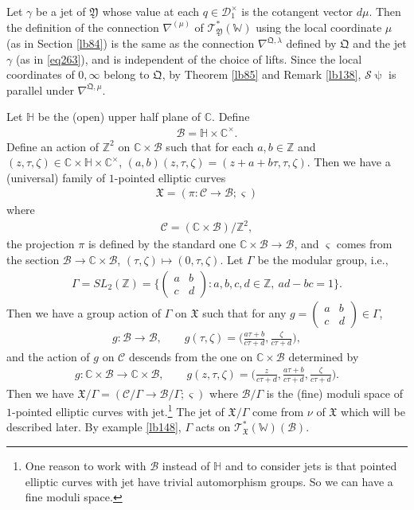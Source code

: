 \documentclass[12pt,a4paper,notitlepage]{report}
\theoremstyle{definition}
\theoremstyle{plain}
\newcommand{\fk}{\mathfrak}
\newcommand{\mc}{\mathcal}
\newcommand{\scr}{\mathscr}
\newcommand{\sgm}{\varsigma}
\newcommand{\mbb}{\mathbb}
\newcommand{\Wbb}{\mathbb W}
\newcommand{\Cbb}{\mathbb C}
\newcommand{\Zbb}{\mathbb Z}
\numberwithin{equation}{section}
\begin{document}
Let $\gamma$ be a jet of $\fk Y$ whose value at each $q\in\mc D_1^\times$ is the cotangent vector $d\mu$. Then the definition of the connection $\nabla^{(\mu)}$ of $\scr T_{\fk Y}^*(\Wbb)$ using the local coordinate $\mu$ (as in Section \ref{lb84})  is the same as the connection $\nabla^{\fk Q,\lambda}$ defined by $\fk Q$ and the jet $\gamma$ (as in \eqref{eq263}), and is independent of the choice of lifts. Since the local coordinates of $0,\infty$ belong to $\fk Q$, by Theorem \ref{lb85} and Remark \ref{lb138}, $\mc S\uppsi$ is parallel under $\nabla^{\fk Q,\mu}$.


Let $\mbb H$ be the (open) upper half plane of $\Cbb$. Define
\begin{align*}
\mc B=\mbb H\times\Cbb^\times.
\end{align*}
Define an action of $\Zbb^2$ on $\Cbb\times\mc B$ such that for each $a,b\in\Zbb$ and $(z,\tau,\zeta)\in\Cbb\times\mbb H\times\Cbb^\times$, $(a,b)(z,\tau,\zeta)=(z+a+b\tau,\tau,\zeta)$. Then we have a (universal) family of $1$-pointed elliptic curves
\begin{align*}
\fk X=(\pi:\mc C\rightarrow\mc B;\sgm)
\end{align*}
where 
\begin{align*}
\mc C=(\Cbb\times\mc B)/\Zbb^2,
\end{align*}
the projection $\pi$ is defined by the standard one $\Cbb\times\mc B\rightarrow\mc B$, and $\sgm$ comes from the section $\mc B\rightarrow\Cbb\times \mc B$, $(\tau,\zeta)\mapsto (0,\tau,\zeta)$. Let $\Gamma$ be the modular group, i.e.,
\begin{align*}
\Gamma=SL_2(\Zbb)=\bigg\{\begin{pmatrix}
a & b\\
c & d
\end{pmatrix}
:a,b,c,d\in\Zbb,~ad-bc=1
\bigg\}.
\end{align*}
Then we have a group action of $\Gamma$ on $\fk X$ such that for any $g=\begin{pmatrix}
a & b\\
c & d
\end{pmatrix}\in \Gamma$, 
\begin{gather*}
g:\mc B\rightarrow\mc B,\qquad g(\tau,\zeta)=\Big(\frac{a\tau+b}{c\tau+d},\frac \zeta{c\tau+d}  \Big),
\end{gather*}
and the action of $g$ on $\mc C$ descends from the one on $\Cbb\times\mc B$ determined by
\begin{gather*}
g:\Cbb\times\mc B\rightarrow \Cbb\times\mc B,\qquad g(z,\tau,\zeta)=\Big(\frac z{c\tau+d},\frac{a\tau+b}{c\tau+d},\frac \zeta{c\tau+d}  \Big).
\end{gather*}
Then we have  $\fk X/\Gamma=(\mc C/\Gamma\rightarrow \mc B/\Gamma;\sgm)$ where $\mc B/\Gamma$ is the (fine) moduli space of $1$-pointed elliptic curves with jet.\footnote{One reason to work with $\mc B$ instead of $\mbb H$ and to consider jets is that pointed elliptic curves with jet have trivial automorphism groups. So we can have a fine moduli space.} The jet of $\fk X/\Gamma$ come from $\nu$ of $\fk X$ which will be described later. By example \ref{lb148}, $\Gamma$ acts on $\scr T_{\fk X}^*(\Wbb)(\mc B)$.
\end{document}
